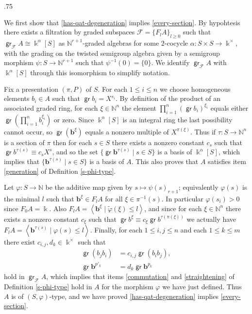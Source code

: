 \documentclass[11pt,fleqn]{article}
\makeatletter
\renewenvironment{proof}[1][\textit{Proof}]{\par
  \pushQED{\qed}%
  \normalfont \topsep.75\paraskip\relax
  \trivlist
  \item[\hskip\labelsep
        \itshape
    #1\@addpunct{.}]\ignorespaces
}{%
  \popQED\endtrivlist\@endpefalse
}
\newcommand\NN{\mathbb N}
\renewcommand\to{\longrightarrow}
\renewcommand\phi{\varphi}
\newcommand\vspan[1]{\left\langle #1 \right\rangle}
\newcommand\F{\mathcal F}
\newcommand\tphi{\tilde \phi}
\renewcommand\b{\mathbf b}
\renewcommand\k{\Bbbk}
\DeclareMathOperator\gr{\mathsf{gr}}
\makeatother
\begin{document}
\begin{proof}
We first show that \ref{has-qat-degeneration} implies \ref{every-section}. By 
hypohtesis there exists a filtration by graded subspaces $\F = \{F_lA\}_{l 
\geq 0}$ such that $\gr_\F A \cong \k^\alpha[S]$ as $\NN^{r+1}$-graded 
algebras for some $2$-cocycle $\alpha: S \times S \to \k^\times$, with the 
grading on the twisted semigroup algebra given by a semigroup morphism 
$\psi: S \to \NN^{r+1}$ such that $\psi^{-1}(0) = \{0\}$. We identify 
$\gr_\F A$ with $\k^\alpha[S]$ through this isomorphism to simplify notation. 

Fix a presentation $(\pi, P)$ of $S$. For each $1 \leq i \leq n$ we choose 
homogeneous elements $b_i \in A$ such that $\gr b_i = X^{s_i}$. By definition 
of the product of an associated graded ring, for each $\xi \in \NN^n$ the 
element $\prod_{i = 1}^n (\gr b_i)^{\xi_i}$ equals either $\gr 
\left(\prod_{i = 1}^n b_i^{\xi_i}\right)$ or zero. Since $\k^\alpha[S]$ is an 
integral ring the last possibility cannot occur, so $\gr (\b^\xi)$ equals a 
nonzero multiple of $X^{\pi(\xi)}$. Thus if $\tau: S \to \NN^n$ is a section 
of $\pi$ then for each $s \in S$ there exists a nonzero constant $c_s$ such 
that $\gr b^{\tau(s)} \equiv c_s X^s$, and so the set $\{\gr \b^{\tau(s)} 
\mid s \in S\}$ is a basis of $\k^\alpha[S]$, which implies that 
$\{\b^{\tau(s)} \mid s \in S\}$ is a basis of $A$. This also proves that $A$ 
satisfies item \ref{generation} of Definition \ref{s-phi-type}.

Let $\phi: S \to \NN$ be the additive map given by $s \mapsto \psi(s)_{r+1}$; 
equivalently $\phi(s)$ is the minimal $l$ such that $\b^\xi \in F_l A$ for all 
$\xi \in \pi^{-1}(s)$. In particular $\phi(s_i) > 0$ since $F_0A = \k$. Also 
$F_lA = \vspan{\b^\xi \mid \tphi(\xi) \leq l}$, and since for each $\xi \in 
\NN^n$ there exists a nonzero constant $c_\xi$ such that $\gr b^\xi \equiv 
c_\xi \gr b^{\tau(\pi(\xi))}$ we actually have $F_lA = \vspan{\b^{\tau(s)} 
\mid \phi(s) \leq l}$. Finally, for each $1 \leq i,j \leq n$ and each $1 
\leq k \leq m$ there exist $c_{i,j}, d_k \in \k^\times$ such that
\begin{align*}
  \gr (b_j b_i) &= c_{i,j} \gr (b_i b_j),\\
  \gr \b^{p'_k} &= d_k \gr \b^{p_k}
\end{align*}
hold in $\gr_\F A$, which implies that items \ref{commutation} and 
\ref{straightening} of Definition \ref{s-phi-type} hold in $A$ for the morphism
$\phi$ we have just defined. Thus $A$ is of $(S,\phi)$-type, and we have 
proved \ref{has-qat-degeneration} implies \ref{every-section}.


\end{proof}
\end{document}

